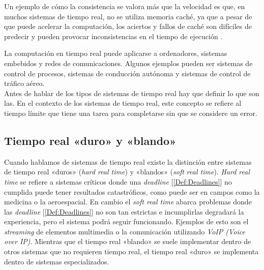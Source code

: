 Un ejemplo de cómo la consistencia se valora más que la velocidad es que, en muchos sistemas de tiempo real, no se utiliza memoria caché, ya que a pesar de que puede acelerar la computación, los aciertos y fallos de caché son difíciles de predecir y pueden provocar inconsistencias en el tiempo de ejecución \cite{MILLIGAN1996}.

La computación en tiempo real puede aplicarse a ordenadores, sistemas embebidos y redes de comunicaciones. Algunos ejemplos pueden ser sistemas de control de procesos, sistemas de conducción autónoma y sistemas de control de tráfico aéreo.\\

Antes de hablar de los tipos de sistemas de tiempo real hay que definir lo que son las. En el contexto de los sistemas de tiempo real, este concepto se refiere al tiempo límite que tiene una tarea para completarse sin que se considere un error.

\subsection{Tiempo real «duro» y «blando»}
Cuando hablamos de sistemas de tiempo real existe la distinción entre sistemas de tiempo real «duros» (\emph{hard real time}) y «blandos» (\emph{soft real time}). \emph{Hard real time} se refiere a sistemas críticos donde una \emph{deadline} [\ref{Def:Deadlines}] no cumplida puede tener resultados catastróficos, como puede ser en campos como la medicina o la aeroespacial. En cambio el \emph{soft real time} abarca problemas donde las \emph{deadline} [\ref{Def:Deadlines}] no son tan estrictas e incumplirlas degradará la experiencia, pero el sistema podrá seguir funcionando. Ejemplos de esto son el \emph{streaming} de elementos multimedia o la comunicación utilizando \emph{VoIP (Voice over IP)}. Mientras que el tiempo real «blando» se suele implementar dentro de otros sistemas que no requieren tiempo real, el tiempo real «duro» se implementa dentro de sistemas especializados.


